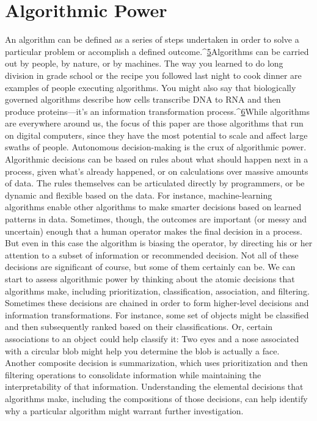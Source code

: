 \chapter{Algorithmic Power }
An algorithm can be defined as a series of steps undertaken in order to solve a particular problem or accomplish a defined outcome.^{\href{#endnotes}{5}}Algorithms can be carried out by people, by nature, or by machines. The way you learned to do long division in grade school or the recipe you followed last night to cook dinner are examples of people executing algorithms. You might also say that biologically governed algorithms describe how cells transcribe DNA to RNA and then produce proteins—it's an information transformation process.^{\href{#endnotes}{6}}While algorithms are everywhere around us, the focus of this paper are those algorithms that run on digital computers, since they have the most potential to scale and affect large swaths of people. 
Autonomous decision-making is the crux of algorithmic power. Algorithmic decisions can be based on rules about what should happen next in a process, given what's already happened, or on calculations over massive amounts of data. The rules themselves can be articulated directly by programmers, or be dynamic and flexible based on the data. For instance, machine-learning algorithms enable other algorithms to make smarter decisions based on learned patterns in data. Sometimes, though, the outcomes are important (or messy and uncertain) enough that a human operator makes the final decision in a process. But even in this case the algorithm is biasing the operator, by directing his or her attention to a subset of information or recommended decision. Not all of these decisions are significant of course, but some of them certainly can be. 
We can start to assess algorithmic power by thinking about the atomic decisions that algorithms make, including prioritization, classification, association, and filtering. Sometimes these decisions are chained in order to form higher-level decisions and information transformations. For instance, some set of objects might be classified and then subsequently ranked based on their classifications. Or, certain associations to an object could help classify it: Two eyes and a nose associated with a circular blob might help you determine the blob is actually a face. Another composite decision is summarization, which uses prioritization and then filtering operations to consolidate information while maintaining the interpretability of that information. Understanding the elemental decisions that algorithms make, including the compositions of those decisions, can help identify why a particular algorithm might warrant further investigation. 
